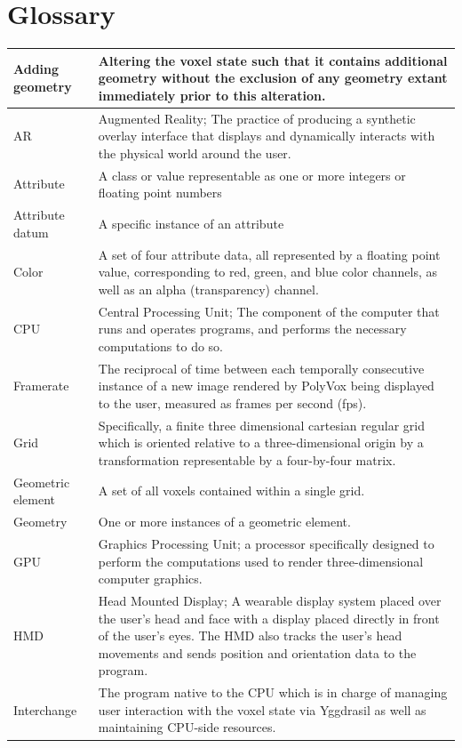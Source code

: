 \documentclass[onecolumn, draftclsnofoot,10pt, compsoc]{IEEEtran}
\begin{document}
\section{Glossary}
\begin{longtable}{ | l | p{12cm} | }
 \hline			
Adding geometry & Altering the voxel state such that it contains additional geometry without the exclusion of any geometry extant immediately prior to this alteration.  \\ \hline 
AR & Augmented Reality; The practice of producing a synthetic overlay interface that displays and dynamically interacts with the physical world around the user. \\ \hline 
Attribute & A class or value representable as one or more integers or floating point numbers  \\ \hline
Attribute datum & A specific instance of an attribute  \\ \hline
Color & A set of four attribute data, all represented by a floating point value, corresponding to red, green, and blue color channels, as well as an alpha (transparency) channel.  \\ \hline
CPU & Central Processing Unit; The component of the computer that runs and operates programs, and performs the necessary computations to do so.  \\ \hline
Framerate & The reciprocal of time between each temporally consecutive instance of a new image rendered by PolyVox being displayed to the user, measured as frames per second (fps). \\ \hline 
Grid &  Specifically, a finite three dimensional cartesian regular grid which is oriented relative to a three-dimensional origin by a transformation representable by a four-by-four matrix. \\ \hline
Geometric element & A set of all voxels contained within a single grid.  \\ \hline
Geometry & One or more instances of a geometric element.  \\ \hline
GPU & Graphics Processing Unit; a processor specifically designed to perform the computations used to render three-dimensional computer graphics.  \\ \hline
HMD & Head Mounted Display; A wearable display system placed over the user’s head and face with a display placed directly in front of the user’s eyes. The HMD also tracks the user’s head movements and sends position and orientation data to the program.  \\ \hline
Interchange & The program native to the CPU which is in charge of managing user interaction with the voxel state via Yggdrasil as well as maintaining CPU-side resources. \\ \hline

\end{longtable}
\end{document}
